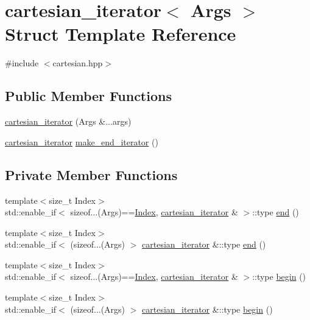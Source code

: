 \hypertarget{structyuh_1_1detail_1_1cartesian__iterator}{\section{cartesian\-\_\-iterator$<$ \-Args $>$ \-Struct \-Template \-Reference}
\label{d4/dcb/structyuh_1_1detail_1_1cartesian__iterator}
}


{\ttfamily \#include $<$cartesian.\-hpp$>$}

\subsection*{\-Public \-Member \-Functions}
\begin{DoxyCompactItemize}
\item 
\hyperlink{structyuh_1_1detail_1_1cartesian__iterator_a980ea5f727d9c050f396566913129d2a}{cartesian\-\_\-iterator} (\-Args \&...args)
\item 
\hyperlink{structyuh_1_1detail_1_1cartesian__iterator}{cartesian\-\_\-iterator} \hyperlink{structyuh_1_1detail_1_1cartesian__iterator_ae3db79b394b18be19791dbab0fd1b082}{make\-\_\-end\-\_\-iterator} ()
\end{DoxyCompactItemize}
\subsection*{\-Private \-Member \-Functions}
\begin{DoxyCompactItemize}
\item 
{\footnotesize template$<$size\-\_\-t \-Index$>$ }\\std\-::enable\-\_\-if$<$ sizeof...(\-Args)==\hyperlink{structyuh_1_1detail_1_1cartesian__iterator_ad246a90285e74f351a7fb7afc43c0348}{\-Index}, \*
\hyperlink{structyuh_1_1detail_1_1cartesian__iterator}{cartesian\-\_\-iterator} \& $>$\-::type \hyperlink{structyuh_1_1detail_1_1cartesian__iterator_a479f62e7fb7c7e0fd89c7e0077c75e3b}{end} ()
\item 
{\footnotesize template$<$size\-\_\-t \-Index$>$ }\\std\-::enable\-\_\-if$<$ (sizeof...(\-Args) $>$\*
 \hyperlink{structyuh_1_1detail_1_1cartesian__iterator}{cartesian\-\_\-iterator} \&\-::type \hyperlink{structyuh_1_1detail_1_1cartesian__iterator_a2f9f75275bfe5e3e62356697e349ecfe}{end} ()
\item 
{\footnotesize template$<$size\-\_\-t \-Index$>$ }\\std\-::enable\-\_\-if$<$ sizeof...(\-Args)==\hyperlink{structyuh_1_1detail_1_1cartesian__iterator_ad246a90285e74f351a7fb7afc43c0348}{\-Index}, \*
\hyperlink{structyuh_1_1detail_1_1cartesian__iterator}{cartesian\-\_\-iterator} \& $>$\-::type \hyperlink{structyuh_1_1detail_1_1cartesian__iterator_a19d2f45314be468caa73b12f582ce2b1}{begin} ()
\item 
{\footnotesize template$<$size\-\_\-t \-Index$>$ }\\std\-::enable\-\_\-if$<$ (sizeof...(\-Args) $>$\*
 \hyperlink{structyuh_1_1detail_1_1cartesian__iterator}{cartesian\-\_\-iterator} \&\-::type \hyperlink{structyuh_1_1detail_1_1cartesian__iterator_a6938d0f40b5cc13a1161c4a1360892c8}{begin} ()
\end{DoxyCompactItemize}
